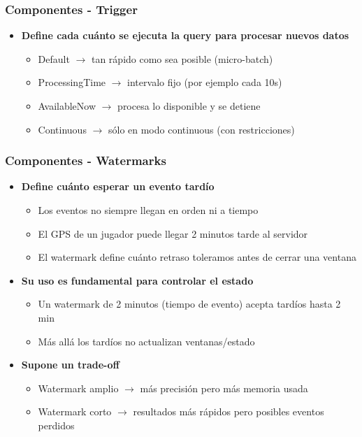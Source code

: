 \documentclass[aspectratio=169]{beamer}
\begin{document}
\begin{frame}\frametitle{Componentes - Trigger}
	\begin{itemize}
		\item \textbf{Define cada cuánto se ejecuta la query para procesar nuevos datos}
		\begin{itemize}
			\item Default $\rightarrow$ tan rápido como sea posible (micro-batch)
			\item ProcessingTime $\rightarrow$ intervalo fijo (por ejemplo cada 10s)
			\item AvailableNow $\rightarrow$ procesa lo disponible y se detiene
			\item Continuous $\rightarrow$ sólo en modo continuous (con restricciones)
		\end{itemize}
	\end{itemize}
\end{frame}

\begin{frame}\frametitle{Componentes - Watermarks}
	\begin{itemize}
		\item \textbf{Define cuánto esperar un evento tardío}
		\begin{itemize}
			\item Los eventos no siempre llegan en orden ni a tiempo
			\item El GPS de un jugador puede llegar 2 minutos tarde al servidor
			\item El watermark define cuánto retraso toleramos antes de cerrar una ventana
		\end{itemize}

		\vspace{1em}

		\item \textbf{Su uso es fundamental para controlar el estado}
		\begin{itemize}
			\item Un watermark de 2 minutos (tiempo de evento) acepta tardíos hasta 2 min
			\item Más allá los tardíos no actualizan ventanas/estado
		\end{itemize}

		\vspace{1em}

		\item \textbf{Supone un trade-off}
		\begin{itemize}
			\item Watermark amplio $\rightarrow$ más precisión pero más memoria usada
			\item Watermark corto $\rightarrow$ resultados más rápidos pero posibles eventos perdidos
		\end{itemize}
	\end{itemize}
\end{frame}
\end{document}
